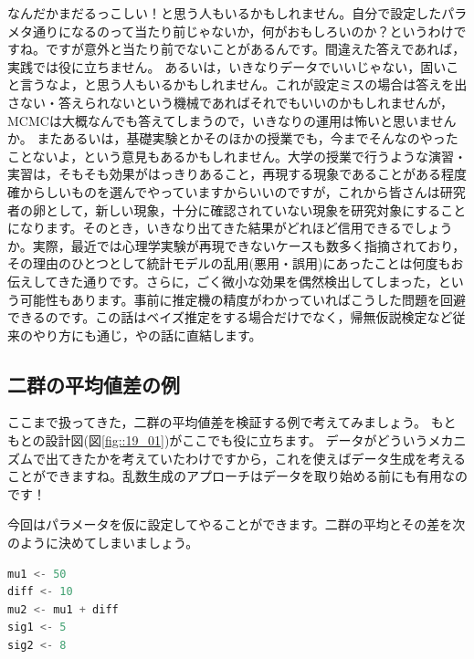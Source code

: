 \documentclass{ltjsbook}
\begin{document}
なんだかまだるっこしい！と思う人もいるかもしれません。自分で設定したパラメタ通りになるのって当たり前じゃないか，何がおもしろいのか？というわけですね。ですが意外と当たり前でないことがあるんです。間違えた答えであれば，実践では役に立ちません。
あるいは，いきなりデータでいいじゃない，固いこと言うなよ，と思う人もいるかもしれません。これが設定ミスの場合は答えを出さない・答えられないという機械であればそれでもいいのかもしれませんが，MCMCは大概なんでも答えてしまうので，いきなりの運用は怖いと思いませんか。
またあるいは，基礎実験とかそのほかの授業でも，今までそんなのやったことないよ，という意見もあるかもしれません。大学の授業で行うような演習・実習は，そもそも効果がはっきりあること，再現する現象であることがある程度確からしいものを選んでやっていますからいいのですが，これから皆さんは研究者の卵として，新しい現象，十分に確認されていない現象を研究対象にすることになります。そのとき，いきなり出てきた結果がどれほど信用できるでしょうか。実際，最近では心理学実験が再現できないケースも数多く指摘されており，その理由のひとつとして統計モデルの乱用(悪用・誤用)にあったことは何度もお伝えしてきた通りです。さらに，ごく微小な効果を偶然検出してしまった，という可能性もあります。事前に推定機の精度がわかっていればこうした問題を回避できるのです。この話はベイズ推定をする場合だけでなく，帰無仮説検定など従来のやり方にも通じ，やの話に直結します。

\subsection{二群の平均値差の例}
ここまで扱ってきた，二群の平均値差を検証する例で考えてみましょう。
もともとの設計図(図\ref{fig::19_01})がここでも役に立ちます。
データがどういうメカニズムで出てきたかを考えていたわけですから，これを使えばデータ生成を考えることができますね。乱数生成のアプローチはデータを取り始める前にも有用なのです！

今回はパラメータを仮に設定してやることができます。二群の平均とその差を次のように決めてしまいましょう。
\begin{lstlisting}[language=c++,label={code:20_02},caption={平均値差の設定}]
mu1 <- 50
diff <- 10
mu2 <- mu1 + diff
sig1 <- 5
sig2 <- 8
\end{lstlisting}
\end{document}
